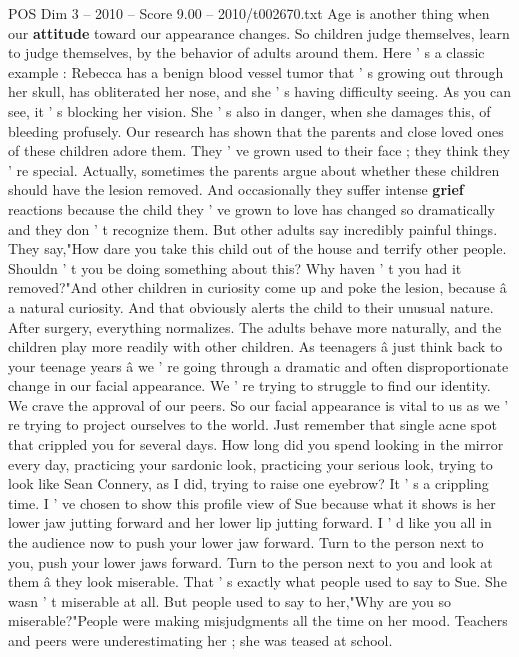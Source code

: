 \begin{textsample}{POS Dim 3 – 2010 – Score 9.00 – 2010/t002670.txt}
Age is another thing when our \textbf{attitude} toward our appearance changes.
So children judge themselves, learn to judge themselves, by the behavior of adults around them.
Here ' s a classic example : Rebecca has a benign blood vessel tumor that ' s growing out through her skull, has obliterated her nose, and she ' s having difficulty seeing.
As you can see, it ' s blocking her vision.
She ' s also in danger, when she damages this, of bleeding profusely.
Our research has shown that the parents and close loved ones of these children adore them.
They ' ve grown used to their face ; they think they ' re special.
Actually, sometimes the parents argue about whether these children should have the lesion removed.
And occasionally they suffer intense \textbf{grief} reactions because the child they ' ve grown to love has changed so dramatically and they don ' t recognize them.
But other adults say incredibly painful things.
They say,"How dare you take this child out of the house and terrify other people.
Shouldn ' t you be doing something about this?
Why haven ' t you had it removed?"And other children in curiosity come up and poke the lesion, because â a natural curiosity.
And that obviously alerts the child to their unusual nature.
After surgery, everything normalizes.
The adults behave more naturally, and the children play more readily with other children.
As teenagers â just think back to your teenage years â we ' re going through a dramatic and often disproportionate change in our facial appearance.
We ' re trying to struggle to find our identity.
We crave the approval of our peers.
So our facial appearance is vital to us as we ' re trying to project ourselves to the world.
Just remember that single acne spot that crippled you for several days.
How long did you spend looking in the mirror every day, practicing your sardonic look, practicing your serious look, trying to look like Sean Connery, as I did, trying to raise one eyebrow?
It ' s a crippling time.
I ' ve chosen to show this profile view of Sue because what it shows is her lower jaw jutting forward and her lower lip jutting forward.
I ' d like you all in the audience now to push your lower jaw forward.
Turn to the person next to you, push your lower jaws forward.
Turn to the person next to you and look at them â they look miserable.
That ' s exactly what people used to say to Sue.
She wasn ' t miserable at all.
But people used to say to her,"Why are you so miserable?"People were making misjudgments all the time on her mood.
Teachers and peers were underestimating her ; she was teased at school.

\end{textsample}
